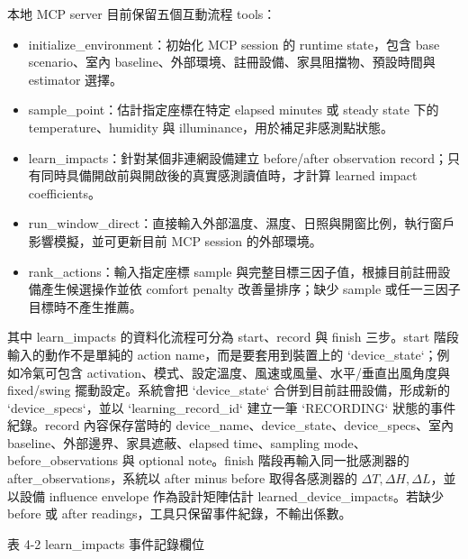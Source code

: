\documentclass[12pt,a4paper]{article}
\begin{document}
本地 MCP server 目前保留五個互動流程 tools：


\begin{itemize}
\item initialize\_\allowbreak{}environment：初始化 MCP session 的 runtime state，包含 base scenario、室內 baseline、外部環境、註冊設備、家具阻擋物、預設時間與 estimator 選擇。
\item sample\_\allowbreak{}point：估計指定座標在特定 elapsed minutes 或 steady state 下的 temperature、humidity 與 illuminance，用於補足非感測點狀態。
\item learn\_\allowbreak{}impacts：針對某個非連網設備建立 before/after observation record；只有同時具備開啟前與開啟後的真實感測讀值時，才計算 learned impact coefficients。
\item run\_\allowbreak{}window\_\allowbreak{}direct：直接輸入外部溫度、濕度、日照與開窗比例，執行窗戶影響模擬，並可更新目前 MCP session 的外部環境。
\item rank\_\allowbreak{}actions：輸入指定座標 sample 與完整目標三因子值，根據目前註冊設備產生候選操作並依 comfort penalty 改善量排序；缺少 sample 或任一三因子目標時不產生推薦。
\end{itemize}

其中 learn\_\allowbreak{}impacts 的資料化流程可分為 start、record 與 finish 三步。start 階段輸入的動作不是單純的 action name，而是要套用到裝置上的 `device\_\allowbreak{}state`；例如冷氣可包含 activation、模式、設定溫度、風速或風量、水平/垂直出風角度與 fixed/swing 擺動設定。系統會把 `device\_\allowbreak{}state` 合併到目前註冊設備，形成新的 `device\_\allowbreak{}specs`，並以 `learning\_\allowbreak{}record\_\allowbreak{}id` 建立一筆 `RECORDING` 狀態的事件紀錄。record 內容保存當時的 device\_\allowbreak{}name、device\_\allowbreak{}state、device\_\allowbreak{}specs、室內 baseline、外部邊界、家具遮蔽、elapsed time、sampling mode、before\_\allowbreak{}observations 與 optional note。finish 階段再輸入同一批感測器的 after\_\allowbreak{}observations，系統以 after minus before 取得各感測器的 $\Delta T,\Delta H,\Delta L$，並以設備 influence envelope 作為設計矩陣估計 learned\_\allowbreak{}device\_\allowbreak{}impacts。若缺少 before 或 after readings，工具只保留事件紀錄，不輸出係數。


表 4-2 learn\_\allowbreak{}impacts 事件記錄欄位
\end{document}
